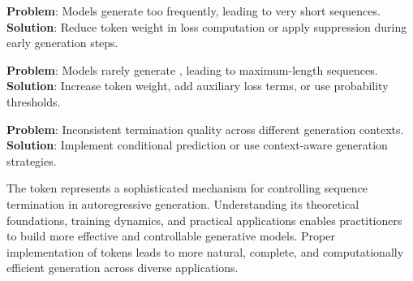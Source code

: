 \textbf{Problem}: Models generate \eos{} too frequently, leading to very short sequences.
\textbf{Solution}: Reduce \eos{} token weight in loss computation or apply \eos{} suppression during early generation steps.

\textbf{Problem}: Models rarely generate \eos{}, leading to maximum-length sequences.
\textbf{Solution}: Increase \eos{} token weight, add auxiliary loss terms, or use \eos{} probability thresholds.

\textbf{Problem}: Inconsistent termination quality across different generation contexts.
\textbf{Solution}: Implement conditional \eos{} prediction or use context-aware generation strategies.

\begin{comment}
Feedback: Format the above problem-solution list properly. Currently they are single lines.

STATUS: addressed - formatted problem-solution pairs with proper LaTeX structure
\end{comment}

The \eos{} token represents a sophisticated mechanism for controlling sequence termination in autoregressive generation. Understanding its theoretical foundations, training dynamics, and practical applications enables practitioners to build more effective and controllable generative models. Proper implementation of \eos{} tokens leads to more natural, complete, and computationally efficient generation across diverse applications.